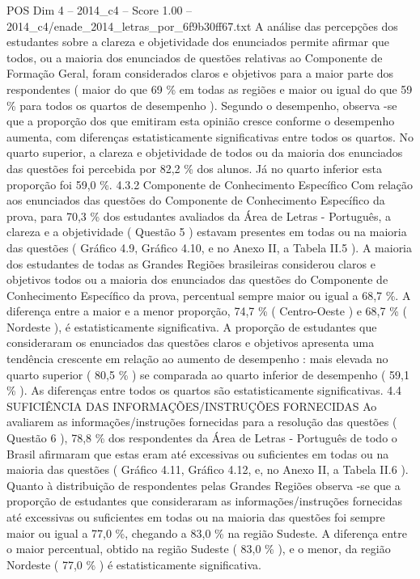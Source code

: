 \begin{textsample}{POS Dim 4 – 2014\_c4 – Score 1.00 – 2014\_c4/enade\_2014\_letras\_por\_6f9b30ff67.txt}
A análise das percepções dos estudantes sobre a clareza e objetividade dos enunciados permite afirmar que todos, ou a maioria dos enunciados de questões relativas ao Componente de Formação Geral, foram considerados claros e objetivos para a maior parte dos respondentes ( maior do que 69 \% em todas as regiões e maior ou igual do que 59 \% para todos os quartos de desempenho ).
Segundo o desempenho, observa -se que a proporção dos que emitiram esta opinião cresce conforme o desempenho aumenta, com diferenças estatisticamente significativas entre todos os quartos.
No quarto superior, a clareza e objetividade de todos ou da maioria dos enunciados das questões foi percebida por 82,2 \% dos alunos.
Já no quarto inferior esta proporção foi 59,0 \%. 4.3.2 Componente de Conhecimento Específico Com relação aos enunciados das questões do Componente de Conhecimento Específico da prova, para 70,3 \% dos estudantes avaliados da Área de Letras - Português, a clareza e a objetividade ( Questão 5 ) estavam presentes em todas ou na maioria das questões ( Gráfico 4.9, Gráfico 4.10, e no Anexo II, a Tabela II.5 ).
A maioria dos estudantes de todas as Grandes Regiões brasileiras considerou claros e objetivos todos ou a maioria dos enunciados das questões do Componente de Conhecimento Específico da prova, percentual sempre maior ou igual a 68,7 \%.
A diferença entre a maior e a menor proporção, 74,7 \% ( Centro-Oeste ) e 68,7 \% ( Nordeste ), é estatisticamente significativa.
A proporção de estudantes que consideraram os enunciados das questões claros e objetivos apresenta uma tendência crescente em relação ao aumento de desempenho : mais elevada no quarto superior ( 80,5 \% ) se comparada ao quarto inferior de desempenho ( 59,1 \% ).
As diferenças entre todos os quartos são estatisticamente significativas. 4.4 SUFICIÊNCIA DAS INFORMAÇÕES/INSTRUÇÕES FORNECIDAS Ao avaliarem as informações/instruções fornecidas para a resolução das questões ( Questão 6 ), 78,8 \% dos respondentes da Área de Letras - Português de todo o Brasil afirmaram que estas eram até excessivas ou suficientes em todas ou na maioria das questões ( Gráfico 4.11, Gráfico 4.12, e, no Anexo II, a Tabela II.6 ).
Quanto à distribuição de respondentes pelas Grandes Regiões observa -se que a proporção de estudantes que consideraram as informações/instruções fornecidas até excessivas ou suficientes em todas ou na maioria das questões foi sempre maior ou igual a 77,0 \%, chegando a 83,0 \% na região Sudeste.
A diferença entre o maior percentual, obtido na região Sudeste ( 83,0 \% ), e o menor, da região Nordeste ( 77,0 \% ) é estatisticamente significativa.

\end{textsample}
